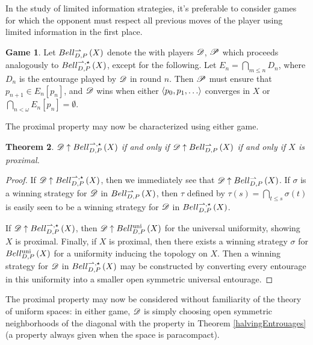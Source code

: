 \documentclass{amsart}
\newtheorem{theorem}{Theorem}[section]
\theoremstyle{definition}
\newtheorem{game}[theorem]{Game}
\begin{document}
  In the study of limited information strategies, it's preferable to
  consider games for which the opponent must respect all previous moves
  of the player using limited information in the first place.

  \begin{game}
    Let \(Bell_{D,P}^{\rightharpoonup}\left({X}\right)\) denote the  with players
    \(\mathscr{D}\), \(\mathscr{P}\) which proceeds analogously to \(Bell_{D,P}^{\rightharpoonup,\star}\left({X}\right)\),
    except for the following. Let \(E_n=\bigcap_{m\leq n}D_n\), where \(D_n\) is
    the entourage played by \(\mathscr{D}\) in round \(n\).
    Then \(\mathscr{P}\) must ensure that \(p_{n+1}\in E_n[p_n]\),
    and \(\mathscr{D}\) wins when either \(\<p_0,p_1,\dots\>\) converges in \(X\)
    or \(\bigcap_{n<\omega}E_n[p_n] = \emptyset\).
  \end{game}

  The proximal property may now be characterized using either game.

  \begin{theorem}\label{topologicalProximalGames}
    \(\mathscr{D}\uparrow Bell_{D,P}^{\rightharpoonup,\star}\left({X}\right)\) if and only if
    \(\mathscr{D}\uparrow Bell_{D,P}^{\rightharpoonup}\left({X}\right)\) if and only if
    \(X\) is proximal.
  \end{theorem}

  \begin{proof}
    If \(\mathscr{D}\uparrow Bell_{D,P}^{\rightharpoonup,\star}\left({X}\right)\), then we immediately see that
    \(\mathscr{D}\uparrow Bell_{D,P}^{\rightharpoonup}\left({X}\right)\).
    If \(\sigma\) is a winning strategy for \(\mathscr{D}\)
    in \(Bell_{D,P}^{\rightharpoonup}\left({X}\right)\), then \(\tau\) defined by
    \(\tau(s)=\bigcap_{t\leq s}\sigma(t)\) is easily seen to be a winning
    strategy for \(\mathscr{D}\) in \(Bell_{D,P}^{\rightharpoonup,\star}\left({X}\right)\).

    If \(\mathscr{D}\uparrow Bell_{D,P}^{\rightharpoonup,\star}\left({X}\right)\), then \(\mathscr{D}\uparrow Bell_{D,P}^{\textrm{uni}}\left({X}\right)\)
    for the universal uniformity, showing \(X\) is proximal.
    Finally, if \(X\) is proximal, then there exists a winning strategy
    \(\sigma\) for \(Bell_{D,P}^{\textrm{uni}}\left({X}\right)\) for a uniformity inducing the
    topology on \(X\). Then a winning strategy for \(\mathscr{D}\) in
    \(Bell_{D,P}^{\rightharpoonup,\star}\left({X}\right)\) may be constructed by converting every
    entourage in this uniformity into a smaller open symmetric universal
    entourage.
  \end{proof}

  The proximal property may now be considered without familiarity of
  the theory of uniform spaces: in either game, \(\mathscr{D}\) is simply choosing
  open symmetric neighborhoods of the diagonal with the property in
  Theorem \ref{halvingEntrouages}
  (a property always given when the space is paracompact).
\end{document}
